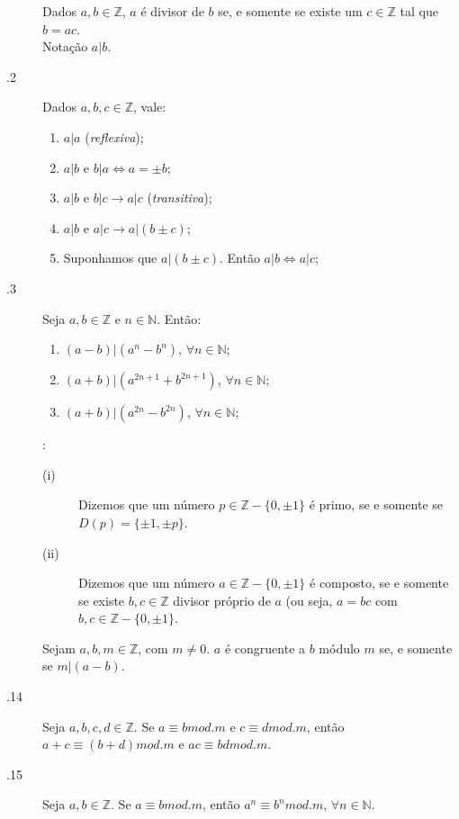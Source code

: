 \documentclass[11pt]{article}
\newcommand{\N}{\mathbb{N}}
\newcommand{\Z}{\mathbb{Z}}
\begin{document}
\begin{description}
  \item[] Dados $a,b \in \Z$, $a$ é divisor de $b$ se, e somente
    se existe um $c \in \Z$ tal que $b=ac$. \\
    Notação $a|b$.
  \item[.2] Dados $a,b,c \in \Z$, vale:
    \begin{enumerate}
      \item $a|a$ (\emph{reflexiva});
      \item $a|b$ e $b|a \iff a = \pm b$;
      \item $a|b$ e $b|c \to a|c$ (\emph{transitiva});
      \item $a|b$ e $a|c \to a|(b\pm c)$;
      \item Suponhamos que $a|(b\pm c)$. Então $a|b \iff a|c$;
    \end{enumerate}
  \item[.3] Seja $a,b \in \Z$ e $n\in \N$. Então:
    \begin{enumerate}
      \item $(a-b)|(a^n -b^n)$, $\forall n \in \N$;
      \item $(a+b)|(a^{2n+1}+b^{2n+1})$, $\forall n \in \N$;
      \item $(a+b)|(a^{2n}-b^{2n})$, $\forall n \in \N$;
    \end{enumerate}
  \item[]:
    \begin{description}
    \item[(i)] Dizemos que um número $p \in \Z-\{0, \pm 1\}$ é primo, se
      e somente se $D(p) = \{\pm 1, \pm p\}$.
    \item[(ii)] Dizemos que um número $a\in \Z-\{0, \pm 1\}$ é composto,
      se e somente se existe $b,c\in \Z$ divisor próprio de $a$ (ou
      seja, $a=bc$ com $b,c\in \Z-\{0,\pm 1\}$.
    \end{description}
  \item[] Sejam $a,b,m \in \Z$, com $m\neq 0$. $a$ é congruente a
    $b$ módulo $m$ se, e somente se $m|(a-b)$.
  \item[.14] Seja $a,b,c,d \in \Z$. Se $a\equiv b mod. m$ e $c
    \equiv d mod. m$, então $a+c\equiv(b+d) mod. m$ e $ac\equiv bd mod. m$.
  \item[.15] Seja $a,b \in \Z$. Se $a\equiv b mod. m$, então $a^n
    \equiv b^n mod. m$, $\forall n \in \N$.
\end{description}
\end{document}
